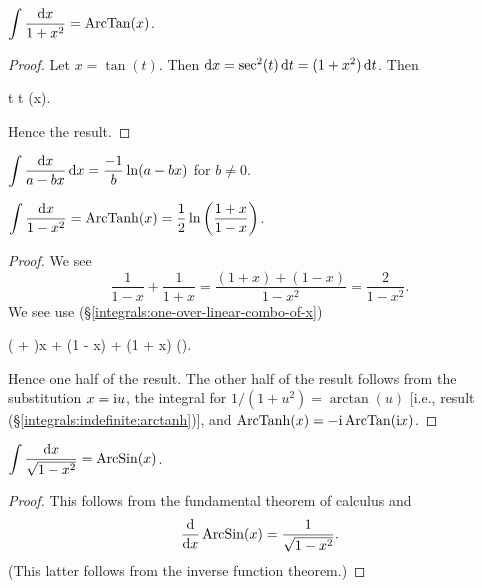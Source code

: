 \M\label{integrals:indefinite:arctanh} $\displaystyle{\int\frac{\mathrm{d}x}{1 + x^{2}} = \operatorname{ArcTan}(x)}$.

\begin{proof}
Let $x=\tan(t)$. Then $\mathrm{d} x = \sec^{2}(t)\,\mathrm{d} t = (1 + x^{2})\,\mathrm{d} t$.
Then
\begin{calculation}
  \int{}
  \int\D t
  t
  \arctan(x).
\end{calculation}
Hence the result.
\end{proof}

\M\label{integrals:one-over-linear-combo-of-x} $\displaystyle{\int\frac{\mathrm{d}x}{a - bx}\,\mathrm{d}x = \frac{-1}{b}\ln(a - bx)}$ for $b\neq0$.

\M $\displaystyle{\int\frac{\mathrm{d}x}{1 - x^{2}} = \operatorname{ArcTanh}(x) = \frac{1}{2}\ln\left(\frac{1+x}{1-x}\right)}$.

\begin{proof}
  We see
\begin{equation}\label{eq:integrals:indefinite:arctanh:intermediate-step}
\frac{1}{1 - x} + \frac{1}{1 + x}
= \frac{(1 + x) + (1 - x)}{1 - x^{2}}
= \frac{2}{1 - x^{2}}.
\end{equation}
We see use (\S\ref{integrals:one-over-linear-combo-of-x}) 
\begin{calculation}
  \int{}
  \int{}\left( + \right)\D x
  \int{} + \int{}
  \ln(1 - x) + \ln(1 + x)
  \ln\left(\right).
\end{calculation}
Hence one half of the result. The other half of the result follows from
the substitution $x=\mathrm{i} u$, the integral for $1/(1+u^{2})=\arctan(u)$
[i.e., result (\S\ref{integrals:indefinite:arctanh})],
and $\operatorname{ArcTanh}(x)=-\mathrm{i}\operatorname{ArcTan}(\mathrm{i} x)$.
\end{proof}

\M $\displaystyle{\int\frac{\mathrm{d}x}{\sqrt{1 - x^{2}}} = \operatorname{ArcSin}(x)}$.

\begin{proof}
This follows from the fundamental theorem of calculus and
\begin{equation}
\frac{\mathrm{d}}{\mathrm{d} x}\operatorname{ArcSin}(x) = \frac{1}{\sqrt{1 - x^{2}}}.
\end{equation}
(This latter follows from the inverse function theorem.)
\end{proof}


